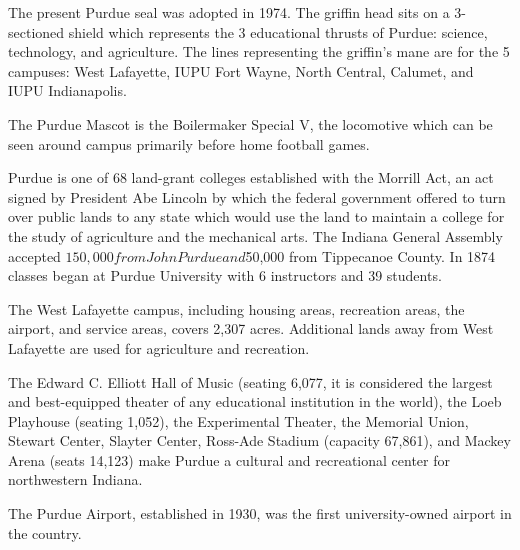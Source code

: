 The present Purdue seal was adopted in 1974. The griffin head sits on a 3-sectioned shield which represents the 3 educational thrusts of Purdue: science, technology, and agriculture. The lines representing the griffin's mane are for the 5 campuses: West Lafayette, IUPU Fort Wayne, North Central, Calumet, and IUPU Indianapolis.

The Purdue Mascot is the Boilermaker Special V, the locomotive which can be seen around campus primarily before home football games.

Purdue is one of 68 land-grant colleges established with the Morrill Act, an act signed by President Abe Lincoln by which the federal government offered to turn over public lands to any state which would use the land to maintain a college for the study of agriculture and the mechanical arts. The Indiana General Assembly accepted $150,000 from John Purdue and $50,000 from Tippecanoe County. In 1874 classes began at Purdue University with 6 instructors and 39 students.

The West Lafayette campus, including housing areas, recreation areas, the airport, and service areas, covers 2,307 acres. Additional lands away from West Lafayette are used for agriculture and recreation.

The Edward C. Elliott Hall of Music (seating 6,077, it is considered the largest and best-equipped theater of any educational institution in the world), the Loeb Playhouse (seating 1,052), the Experimental Theater, the Memorial Union, Stewart Center, Slayter Center, Ross-Ade Stadium (capacity 67,861), and Mackey Arena (seats 14,123) make Purdue a cultural and recreational center for northwestern Indiana.

The Purdue Airport, established in 1930, was the first university-owned airport in the country.

